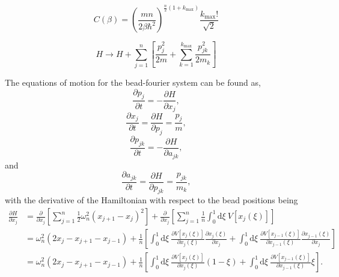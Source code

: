 \documentclass[11 pt]{article}
\begin{document}
  \begin{equation}
    C(\beta) = \left( \frac{mn}{2\beta\hbar^2}\right)^{ \frac{n}{2}(1+k_{\mathrm{max}})}
    \frac{k_\mathrm{max}!}{\sqrt{2}}
  \end{equation}
 
  \begin{equation}
    H \to H + \sum^{n}_{j=1} \left[ \frac{p_j^2}{2m} + \sum^{k_\mathrm{max}}_{k=1} \frac{p_{jk}^2}{2m_{k}}\right]
  \end{equation}

  The equations of motion for the bead-fourier system can be found as,
  \begin{equation}
    \frac{ \partial p_{j}}{ \partial t} = -\frac{ \partial H}{ \partial x_{j}},
    \label{eq:eom-p-bead}
  \end{equation}
  \begin{equation}
    \frac{ \partial x_{j}}{ \partial t} = \frac{ \partial H}{ \partial p_{j}} = \frac{p_{j}}{m},
    \label{eq:eom-x-bead}
  \end{equation}
  \begin{equation}
    \frac{ \partial p_{jk}}{ \partial t} = -\frac{ \partial H}{ \partial a_{jk}},
    \label{eq:eom-p-fourier}
  \end{equation}
  and
  \begin{equation}
    \frac{ \partial a_{jk}}{ \partial t} = \frac{ \partial H}{ \partial p_{jk}} = \frac{p_{jk}}{m_{k}},
    \label{eq:eom-a-fourier}
  \end{equation}
  with the derivative of the Hamiltonian with respect to the bead positions being
  \begin{align} 
    \frac{ \partial H}{ \partial x_j} 
    &= \frac{ \partial }{ \partial x_j} \left[ \sum^{n}_{j=1} \frac{1}{2}\omega_n^2
    (x_{j+1}-x_j)^2 \right] + \frac{ \partial }{ \partial x_j} \left[ \sum^{n}_{j=1} \frac{1}{n} \int_0^1 
    \mathrm{d}\xi\ V[x_j(\xi)] \right] \\
    &= \omega_n^2(2x_j-x_{j+1}-x_{j-1})
    + \frac{1}{n}\left[
    \int_0^1 \mathrm{d}\xi\ \frac{ \partial V[x_j(\xi)]}{ \partial x_j(\xi)} \frac{ \partial x_j(\xi)}{ \partial x_j}
    +\int_0^1 \mathrm{d}\xi\ \frac{ \partial V[x_{j-1}(\xi)]}{ \partial x_{j-1}(\xi)} \frac{ \partial x_{j-1}(\xi)}{
    \partial x_j}\right]\\
    &= \omega_n^2(2x_j-x_{j+1}-x_{j-1})
    + \frac{1}{n}\left[
    \int_0^1 \mathrm{d}\xi\ \frac{ \partial V[x_j(\xi)]}{ \partial x_j(\xi)}(1-\xi)
    +\int_0^1 \mathrm{d}\xi\ \frac{ \partial V[x_{j-1}(\xi)]}{ \partial x_{j-1}(\xi)}\xi
    \right].
    \label{eq:part-x}
  \end{align}
\end{document}
